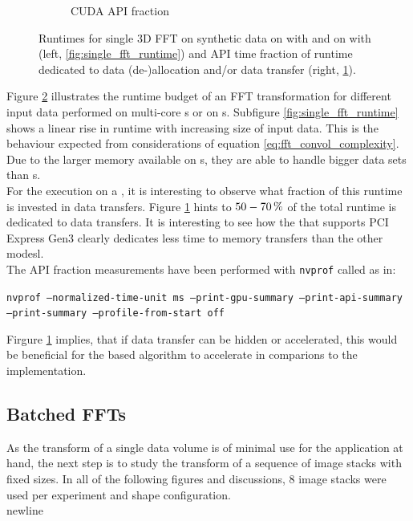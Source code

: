 \begin{figure}[h]
\begin{subfigure}[b]{0.45\textwidth}
    \caption{CUDA API fraction}
    \label{fig:single_fft_api_fraction}
  \end{subfigure}
  \hfill
  \caption{Runtimes for single 3D FFT on synthetic data on \cpu{} with \fftw{} and on \gpu{} with \cufft{} (left, \ref{fig:single_fft_runtime}) and API time fraction of runtime dedicated to data (de-)allocation and/or data transfer (right, \ref{fig:single_fft_api_fraction}).}
  \label{fig:rt_single_fft}
\end{figure}

Figure \ref{fig:rt_single_fft} illustrates the runtime budget of an FFT transformation for different input data performed on multi-core \cpu{}s or on \gpu{}s. Subfigure \ref{fig:single_fft_runtime} shows a linear rise in runtime with increasing size of input data. This is the behaviour expected from considerations of equation \ref{eq:fft_convol_complexity}. Due to the larger memory available on \cpu{}s, they are able to handle bigger data sets than \gpu{}s.\\

For the execution on a \gpu{}, it is interesting to observe what fraction of this runtime is invested in data transfers. Figure \ref{fig:single_fft_api_fraction} hints to $\unit[50-70]{\%}$ of the total runtime is dedicated to data transfers. It is interesting to see how the \gpu{} that supports PCI Express Gen3 clearly dedicates less time to memory transfers than the other modesl. \\

The API fraction measurements have been performed with \texttt{nvprof} called as in:\newline
\begin{center}
  \texttt{nvprof --normalized-time-unit ms --print-gpu-summary --print-api-summary --print-summary --profile-from-start off}\newline
\end{center}

Firgure \ref{fig:single_fft_api_fraction} implies, that if data transfer can be hidden or accelerated, this would be beneficial for the \gpu{} based algorithm to accelerate in comparions to the \cpu{} implementation.

\clearpage
\subsection{Batched FFTs}
As the transform of a single data volume is of minimal use for the application at hand, the next step is to study the transform of a sequence of image stacks with fixed sizes. In all of the following figures and discussions, 8 image stacks were used per experiment and shape configuration.\\newline
 
